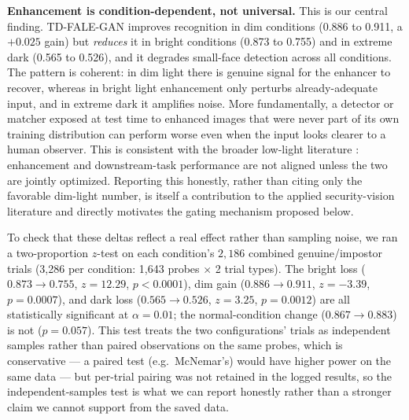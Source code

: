 \documentclass[conference]{IEEEtran}
\begin{document}
\textbf{Enhancement is condition-dependent, not universal.} This
is our central finding. TD-FALE-GAN improves recognition in dim
conditions (0.886 to 0.911, a $+0.025$ gain) but \textit{reduces}
it in bright conditions (0.873 to 0.755) and in extreme dark
(0.565 to 0.526), and it degrades small-face detection across all
conditions. The pattern is coherent: in dim light there is
genuine signal for the enhancer to recover, whereas in bright
light enhancement only perturbs already-adequate input, and in
extreme dark it amplifies noise. More fundamentally, a detector
or matcher exposed at test time to enhanced images that were
never part of its own training distribution can perform worse
even when the input looks clearer to a human observer. This is
consistent with the broader low-light literature
\cite{lowlightsurvey}: enhancement and downstream-task
performance are not aligned unless the two are jointly optimized.
Reporting this honestly, rather than citing only the favorable
dim-light number, is itself a contribution to the applied
security-vision literature and directly motivates the gating
mechanism proposed below.

To check that these deltas reflect a real effect rather than
sampling noise, we ran a two-proportion $z$-test on each
condition's $2{,}\!186$ combined genuine/impostor trials (3{,}286
per condition: 1{,}643 probes $\times$ 2 trial types). The bright
loss ($0.873\to0.755$, $z{=}12.29$, $p{<}0.0001$), dim gain
($0.886\to0.911$, $z{=}{-}3.39$, $p{=}0.0007$), and dark loss
($0.565\to0.526$, $z{=}3.25$, $p{=}0.0012$) are all statistically
significant at $\alpha{=}0.01$; the normal-condition change
($0.867\to0.883$) is not ($p{=}0.057$). This test treats the two
configurations' trials as independent samples rather than paired
observations on the same probes, which is conservative --- a
paired test (e.g.\ McNemar's) would have higher power on the same
data --- but per-trial pairing was not retained in the logged
results, so the independent-samples test is what we can report
honestly rather than a stronger claim we cannot support from the
saved data.
\end{document}
